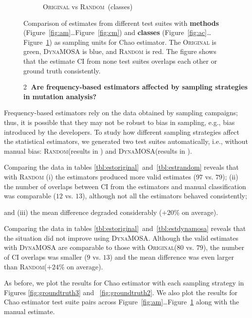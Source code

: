 \documentclass[sigconf]{acmart}
\newcommand{\Chao}{Chao\xspace}
\newcommand{\original}{\textsc{Original}\xspace}
\newcommand{\EvosuiteRandom}{\textsc{Random}\xspace}
\newcommand{\EvosuiteDynamosa}{\textsc{DynaMOSA}\xspace}
\newcommand{\RQBx}{%
\begin{description}\item[] \textcircled{2} \textbf{Are frequency-based estimators affected by sampling strategies in mutation analysis?}\end{description}}
\newcommand{\todo}[1]{}
\begin{document}
\begin{figure}
\begin{subfigure}{.28\textwidth}
  \caption{\textcolor{coriginal}\original vs \textcolor{crandom}\EvosuiteRandom~(classes)}
\label{fig:cc}
\end{subfigure}
  \caption{Comparison of estimates from different test suites with \textbf{methods} (Figure~\ref{fig:am}\ldots Figure~\ref{fig:cm}) and \textbf{classes} (Figure~\ref{fig:ac}\ldots Figure~\ref{fig:cc}) as sampling units for \Chao estimator.
  The \original is \textcolor{coriginal}{green}, 
  \EvosuiteDynamosa is \textcolor{cdynamosa}{blue},
  and \EvosuiteRandom is \textcolor{crandom}{red}. The figure shows that the estimate CI from none test suites overlaps each other or ground truth consistently.}
\label{fig:classsamplingunit}
\end{figure}

\RQBx
Frequency-based estimators rely on the data obtained by sampling campaigns;
thus, it is possible that they %
may not be robust to bias in sampling, e.g., bias introduced by the developers.
To study how different sampling strategies affect the statistical estimators,
we generated two test suites automatically, i.e., without manual bias:
\EvosuiteRandom (results in ) and \EvosuiteDynamosa (results in ).



Comparing the data in tables \ref{tbl:estoriginal}~and~\ref{tbl:estrandom}
reveals that with \EvosuiteRandom
(i) the estimators produced more valid estimates ($97$ vs. $79$);
(ii) the number of overlaps between CI from the estimators and manual classification
was comparable ($12$ vs. $13$), although not all the estimators behaved consistently;
\todo{ALESSIO: some lost, some gain, the majority stayed the same}
and (iii) the mean difference degraded considerably ($+20\%$ on average).


Comparing the data in tables \ref{tbl:estoriginal}~and~\ref{tbl:estdynamosa}
reveals that the situation did not improve using \EvosuiteDynamosa.
Although the valid estimates with \EvosuiteDynamosa are comparable to those with \original ($80$ vs. $79$),
the number of CI overlaps was smaller ($9$ vs. $13$) and the mean difference was even larger than \EvosuiteRandom ($+24\%$ on average).

As before, we plot the results for \Chao estimator with each sampling strategy %
in Figures \ref{fig:groundtruth3} and ~\ref{fig:groundtruth2}.
We also plot the results for \Chao estimator test suite pairs across Figure~\ref{fig:am}\ldots Figure~\ref{fig:cc} along with the manual estimate.
\end{document}
